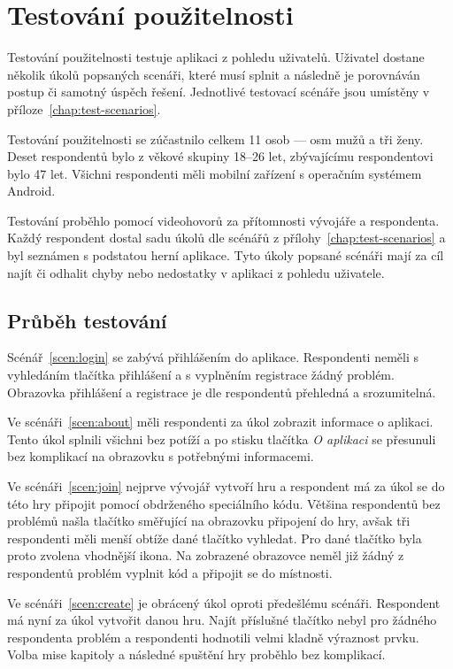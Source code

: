 \section{Testování použitelnosti}
\label{sec:usability}

Testování použitelnosti testuje aplikaci z pohledu uživatelů.
Uživatel dostane několik úkolů popsaných scenáři,
které musí splnit a následně je porovnáván postup či samotný úspěch řešení.
Jednotlivé testovací scénáře jsou umístěny v příloze~\ref{chap:test-scenarios}.

Testování použitelnosti se zúčastnilo celkem 11 osob ---
osm mužů a tři ženy.
Deset respondentů bylo z věkové skupiny 18--26 let,
zbývajícímu respondentovi bylo 47 let.
Všichni respondenti měli mobilní zařízení s operačním systémem Android.

Testování proběhlo pomocí videohovorů za přítomnosti vývojáře a respondenta.
Každý respondent dostal sadu úkolů dle scénářů
z přílohy~\ref{chap:test-scenarios}
a byl seznámen s podstatou herní aplikace.
Tyto úkoly popsané scénáři mají za cíl najít či odhalit chyby nebo nedostatky
v aplikaci z pohledu uživatele.

\subsection{Průběh testování}

Scénář~\ref{scen:login} se zabývá přihlášením do aplikace.
Respondenti neměli s vyhledáním tlačítka přihlášení
a s vyplněním registrace žádný problém.
Obrazovka přihlášení a registrace je dle respondentů přehledná a srozumitelná.

Ve scénáři~\ref{scen:about} měli respondenti za úkol zobrazit informace o
aplikaci.
Tento úkol splnili všichni bez potíží a po stisku tlačítka \emph{O aplikaci}
se přesunuli bez komplikací na obrazovku s potřebnými informacemi.

Ve scénáři~\ref{scen:join} nejprve vývojář vytvoří hru a respondent má za úkol
se do této hry připojit pomocí obdrženého speciálního kódu.
Většina respondentů bez problémů našla tlačítko směřující na obrazovku připojení
do hry,
avšak tři respondenti měli menší obtíže dané tlačítko vyhledat.
Pro dané tlačítko byla proto zvolena vhodnější ikona.
Na zobrazené obrazovce neměl již žádný z respondentů problém vyplnit kód
a připojit se do místnosti.

Ve scénáři~\ref{scen:create} je obrácený úkol oproti předešlému scénáři.
Respondent má nyní za úkol vytvořit danou hru.
Najít příslušné tlačítko nebyl pro žádného respondenta problém
a respondenti hodnotili velmi kladně výraznost prvku.
Volba mise kapitoly a následné spuštění hry proběhlo bez komplikací.

